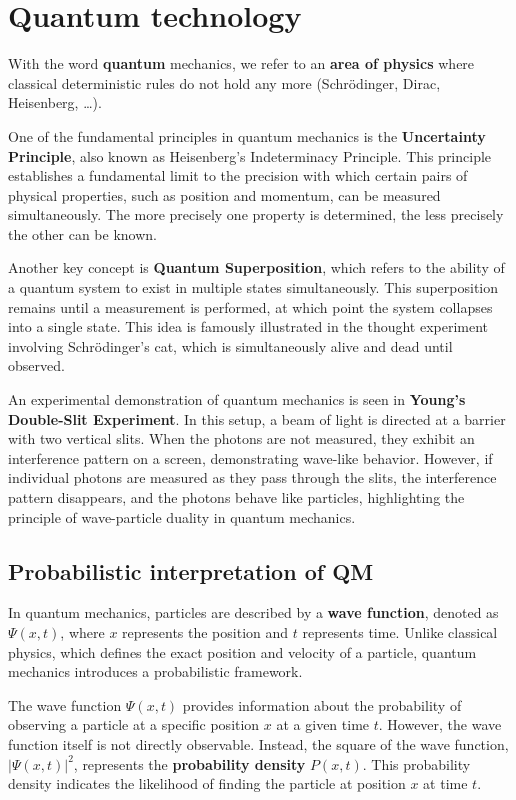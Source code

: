 \chapter{Quantum technology}
\label{ch:quantum}

With the word \textbf{quantum} mechanics, we refer to an \textbf{area
of physics} where classical deterministic rules do not hold any more
(Schrödinger, Dirac, Heisenberg, \dots).

One of the fundamental principles in quantum mechanics is the
\textbf{Uncertainty Principle}, also known as Heisenberg's
Indeterminacy Principle. This principle establishes a fundamental
limit to the precision with which certain pairs of physical
properties, such as position and momentum, can be measured
simultaneously. The more precisely one property is determined, the
less precisely the other can be known.

Another key concept is \textbf{Quantum Superposition}, which refers to
the ability of a quantum system to exist in multiple states
simultaneously. This superposition remains until a measurement is
performed, at which point the system collapses into a single state.
This idea is famously illustrated in the thought experiment involving
Schrödinger's cat, which is simultaneously alive and dead until
observed.

An experimental demonstration of quantum mechanics is seen in
\textbf{Young's Double-Slit Experiment}. In this setup, a beam of
light is directed at a barrier with two vertical slits. When the
photons are not measured, they exhibit an interference pattern on a
screen, demonstrating wave-like behavior. However, if individual
photons are measured as they pass through the slits, the interference
pattern disappears, and the photons behave like particles,
highlighting the principle of wave-particle duality in quantum
mechanics.

\section{Probabilistic interpretation of QM}

In quantum mechanics, particles are described by a \textbf{wave
function}, denoted as \(\Psi(x,t)\), where \(x\) represents the
position and \(t\) represents time. Unlike classical physics, which
defines the exact position and velocity of a particle, quantum
mechanics introduces a probabilistic framework.

The wave function \(\Psi(x,t)\) provides information about the
probability of observing a particle at a specific position \(x\) at a
given time \(t\). However, the wave function itself is not directly
observable. Instead, the square of the wave function,
\(|\Psi(x,t)|^2\), represents the \textbf{probability density}
\(P(x,t)\). This probability density indicates the likelihood of
finding the particle at position \(x\) at time \(t\).

